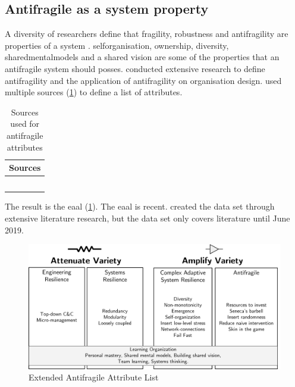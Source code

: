 \subsection{Antifragile as a system property}
\label{sub:backgroundafpropertyofsystem}
A diversity of researchers define that \gls{fragility}, \gls{robustness} and \gls{antifragility} are properties of a system \parencites{Jaaron2014}{Hole2016}{Kastner2017}{OReilly2019}{Botjes2021}. \Gls{selforganisation}, ownership, \gls{diversity}, \glspl{sharedmentalmodel} and a shared vision are some of the properties that an \gls{antifragile} system should posses. \textcite{Botjes2021} conducted extensive research to define \gls{antifragility} and the application of \gls{antifragility} on organisation design. \citeauthor{Botjes2021} used multiple sources (\cref{tab:tbsourcesofantifragileattributes}) to define a list of attributes.
\begin{table}[H]
	\centering
	\begin{tabular}{@{}p{}p{}@{}}
		\toprule
		\multicolumn{2}{c}{\textbf{Sources}} \\%
		\midrule
		\textcite{Ghasemi2017} & \textcite{Johnson2013} \\%
		\textcite{Kennon2015} & \textcite{Markey2018} \\%
		\textcite{Hendriksson2016} & \textcite{Kastner2017} \\%
		\textcite{Gorgeon2015} & \textcite{Hole2016} \\%
		\textcite{OReilly2019} & \\%
		\bottomrule
	\end{tabular}%
	\caption[Sources used for antifragile attributes \parencite{Botjes2021}]{Sources used for antifragile attributes \parencite{Botjes2021}}
	\label{tab:tbsourcesofantifragileattributes}%
\end{table}%
The result is the \acrfull{eaal} (\cref{fig:eaalbw}). The \acrfull{eaal} is recent. \citeauthor[p.~5]{Botjes2021} created the data set through extensive literature research, but the data set only covers literature until June 2019. 
\begin{figure}[H]
	\centering
	\includegraphics[width=0.8\linewidth]{images/eaalbw}
	\caption[Extended Antifragile Attribute List \parencite{Botjes2021}]{Extended Antifragile Attribute List \Parencite{Botjes2021}}
	\label{fig:eaalbw}
\end{figure}
